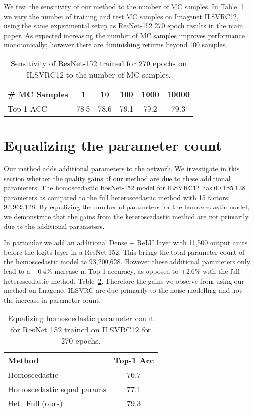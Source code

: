 \documentclass[final]{cvpr}
\begin{document}
We test the sensitivity of our method to the number of MC samples. In Table~\ref{table:mc_sensitivty} we vary the number of training and test MC samples on Imagenet ILSVRC12, using the same experimental setup as ResNet-152 270 epoch results in the main paper. As expected increasing the number of MC samples improves performance monotonically; however there are diminishing returns beyond 100 samples.

\begin{table}[tbh]
\centering
\begin{tabular}{l|ccccc}
\toprule
\# MC Samples & 1 & 10 & 100 & 1000 & 10000 \\
\midrule
Top-1 ACC & 78.5 & 78.6 & 79.1 & 79.2 & 79.3 \\
\bottomrule
\end{tabular}
\caption{Sensitivity of ResNet-152 trained for 270 epochs on ILSVRC12 to the number of MC samples.}
\label{table:mc_sensitivty}
\end{table}

\section{Equalizing the parameter count}
\label{app:equal_params}

Our method adds additional parameters to the network. We investigate in this section whether the quality gains of our method are due to these additional parameters. The homoscedastic ResNet-152 model for ILSVRC12 has 60,185,128 parameters as compared to the full heteroscedastic method with 15 factors: 92,969,128. By equalizing the number of parameters for the homoscedastic model, we demonstrate that the gains from the heteroscedastic method are not primarily due to the additional parameters.

In particular we add an additional Dense + ReLU layer with 11,500 output units before the logits layer in a ResNet-152. This brings the total parameter count of the homoscedastic model to 93,200,628. However these additional parameters only lead to a +0.4\% increase in Top-1 accuracy, as opposed to +2.6\% with the full heteroscedastic method, Table~\ref{table:equal_params_ilsvrc12}. Therefore the gains we observe from using our method on Imagenet ILSVRC are due primarily to the noise modelling and not the increase in parameter count.

\begin{table}[tbh]
\centering
\begin{tabular}{lc}
\toprule
Method & Top-1 Acc \\
\midrule
Homoscedastic & 76.7 \\
Homoscedastic equal params & 77.1 \\
Het.\ Full (ours) & 79.3 \\ 
\bottomrule
\end{tabular}
\caption{Equalizing homoscedastic parameter count for ResNet-152 trained on ILSVRC12 for 270 epochs.} 
\label{table:equal_params_ilsvrc12}
\end{table}
\end{document}
